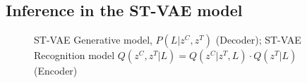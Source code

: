 


\subsection{Inference in the ST-VAE model}
\label{sec:stvae}\vspace{-3mm} 

\begin{figure}[t]
\begin{center}
\qquad\qquad
{}\vspace{-5mm}
\end{center}
 \caption{\footnotesize
  ST-VAE Generative model, $P(L | z^C, z^T)$ (Decoder);  ST-VAE Recognition model $Q(z^C,z^T | L) = Q(z^C | z^T, L)\cdot Q(z^T | L)$ (Encoder)   
  }\vspace{-5mm}
\label{fig:stvaemodel}
\end{figure}


